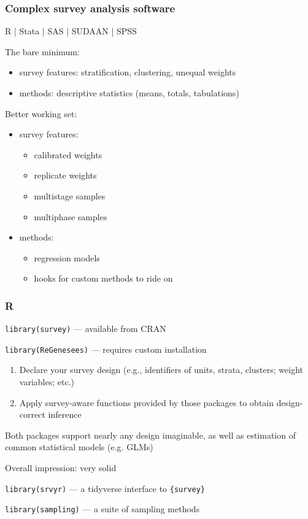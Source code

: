 \documentclass[handout]{beamer}
\begin{document}
\begin{frame}\frametitle{Complex survey analysis software}

R | Stata | SAS | SUDAAN | SPSS

\bigskip

The bare minimum:
\begin{itemize}
    \item survey features: stratification, clustering, unequal weights
    \item methods: descriptive statistics (means, totals, tabulations)
\end{itemize}

Better working set:
\begin{itemize}
    \item survey features:
    \begin{itemize}
        \item calibrated weights
        \item replicate weights
        \item multistage samples
        \item multiphase samples
    \end{itemize}
    \item methods:
    \begin{itemize}
        \item regression models
        \item hooks for custom methods to ride on
    \end{itemize}
\end{itemize}

\end{frame}


\begin{frame}\frametitle{R}

\texttt{library(survey)} --- available from CRAN \citep{lumley:2010}

\texttt{library(ReGenesees)} --- requires custom installation

\begin{enumerate}
    \item Declare your survey design (e.g., identifiers of units, strata, clusters; weight variables; etc.)
    \item Apply survey-aware functions provided by those packages to obtain design-correct inference
\end{enumerate}

Both packages support nearly any design imaginable, as well as estimation of common statistical models (e.g. GLMs)

\bigskip

Overall impression: very solid

\bigskip

\texttt{library(srvyr)} --- a tidyverse interface to \texttt{\{survey\}}

\texttt{library(sampling)} --- a suite of sampling methods \citep{tille:2006}

\end{frame}
\end{document}
